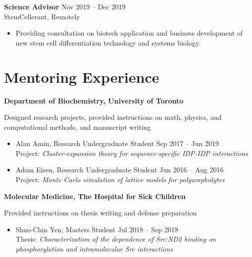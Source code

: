 \documentclass[11pt]{../yhlcv}
\begin{document}
{\bf Science Advisor} \hfill Nov 2019 -- Dec 2019 \vspace{0.25em} \\
StemCellerant, {Remotely}
\vspace{-0.7em}\\
\begin{itemize}[leftmargin=*]\itemsep-0.2em
\item Providing consultation on biotech application and business development of new stem cell differentiation technology and systems biology.
\end{itemize}

\section*{Mentoring Experience}

{\bf Department of Biochemistry, University of Toronto} \vspace{0.25em}

Designed research projects, provided instructions on math, physics, and computational methods, 
and manuscript writing
\vspace{-0.7em}\\
\begin{itemize}[leftmargin=*]\itemsep-0.2em
\item Alan Amin, %
Research Undergraduate Student
\hfill Sep 2017 -- Jun 2019 \\
Project: {\it Cluster-expansion theory for sequence-specific IDP-IDP interactions}

\item Adam Eisen, %
Research Undergraduate Student
\hfill Jun 2016 -- Aug 2016 \\
Project: {\it Monte Carlo simulation of lattice models for polyampholytes} 
\end{itemize}

{\bf Molecular Medicine, The Hospital for Sick Children} \vspace{0.25em}

Provided instructions on thesis writing and defense preparation
\vspace{-0.7em}\\
\begin{itemize}[leftmargin=*]\itemsep-0.2em
\item Shuo-Chin Yen, 
Masters Student 
\hfill Jul 2018 -- Sep 2018 \\
Thesis: {\it Characterization of the dependence of Src:ND2 binding on 
	phosphorylation and intramolecular Src interactions} 
\end{itemize}
\end{document}
